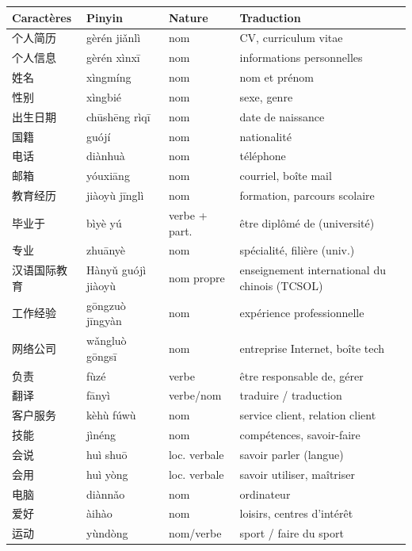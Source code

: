 \documentclass[11pt]{article}
\begin{document}
\begin{center}
\begin{tabularx}{\linewidth}{|X|X|X|X|}
\hline
\rowcolor{popblueL} \textbf{Caractères} & \textbf{Pinyin} & \textbf{Nature} & \textbf{Traduction} \\
\hline
个人简历 & gèrén jiǎnlì & nom & CV, curriculum vitae \\
\hline
个人信息 & gèrén xìnxī & nom & informations personnelles \\
\hline
姓名 & xìngmíng & nom & nom et prénom \\
\hline
性别 & xìngbié & nom & sexe, genre \\
\hline
出生日期 & chūshēng rìqī & nom & date de naissance \\
\hline
国籍 & guójí & nom & nationalité \\
\hline
电话 & diànhuà & nom & téléphone \\
\hline
邮箱 & yóuxiāng & nom & courriel, boîte mail \\
\hline
教育经历 & jiàoyù jīnglì & nom & formation, parcours scolaire \\
\hline
毕业于 & bìyè yú & verbe + part. & être diplômé de (université) \\
\hline
专业 & zhuānyè & nom & spécialité, filière (univ.) \\
\hline
汉语国际教育 & Hànyǔ guójì jiàoyù & nom propre & enseignement international du chinois (TCSOL) \\
\hline
工作经验 & gōngzuò jīngyàn & nom & expérience professionnelle \\
\hline
网络公司 & wǎngluò gōngsī & nom & entreprise Internet, boîte tech \\
\hline
负责 & fùzé & verbe & être responsable de, gérer \\
\hline
翻译 & fānyì & verbe/nom & traduire / traduction \\
\hline
客户服务 & kèhù fúwù & nom & service client, relation client \\
\hline
技能 & jìnéng & nom & compétences, savoir-faire \\
\hline
会说 & huì shuō & loc. verbale & savoir parler (langue) \\
\hline
会用 & huì yòng & loc. verbale & savoir utiliser, maîtriser \\
\hline
电脑 & diànnǎo & nom & ordinateur \\
\hline
爱好 & àihào & nom & loisirs, centres d'intérêt \\
\hline
运动 & yùndòng & nom/verbe & sport / faire du sport \\

\end{tabularx}
\end{center}
\end{document}

